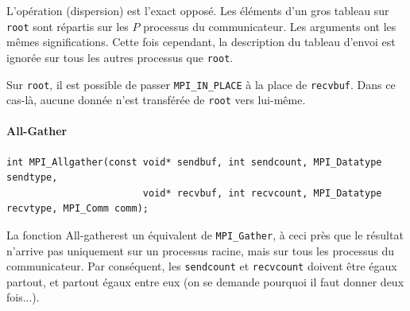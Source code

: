 \begin{center}
\end{center}

L'opération \og {}\fg (\og dispersion\fg) est l'exact
opposé. Les éléments d'un gros tableau sur \verb|root| sont répartis
sur les $P$ processus du communicateur. Les arguments ont les mêmes
significations. Cette fois cependant, la description du tableau
d'envoi est ignorée sur tous les autres processus que \verb|root|.

Sur \verb|root|, il est possible de passer \verb|MPI_IN_PLACE| à la
place de \verb|recvbuf|. Dans ce cas-là, aucune donnée n'est
transférée de \verb|root| vers lui-même.

\paragraph{All-Gather}

\begin{verbatim}
int MPI_Allgather(const void* sendbuf, int sendcount, MPI_Datatype sendtype,
                        void* recvbuf, int recvcount, MPI_Datatype recvtype, MPI_Comm comm);
\end{verbatim}

La fonction \og All-gather\fg est un équivalent de \verb|MPI_Gather|, à ceci
près que le résultat n'arrive pas uniquement sur un processus racine, mais sur
tous les processus du communicateur. Par conséquent, les \verb|sendcount| et
\verb|recvcount| doivent être égaux partout, et partout égaux entre eux (on se
demande pourquoi il faut donner deux fois...).

